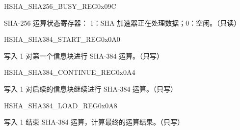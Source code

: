 \begin{register}{H}{SHA\_SHA256\_BUSY\_REG}{0x09C}\label{regdesc:SHASHA256BUSYREG}
%
%
\regnewline%
\begin{regdesc}\begin{reglist}
\item [SHA\_SHA256\_BUSY] SHA-256 运算状态寄存器： 1：SHA 加速器正在处理数据；0：空闲。（只读）
\end{reglist}\end{regdesc}
\end{register}


\begin{register}{H}{SHA\_SHA384\_START\_REG}{0x0A0}\label{regdesc:SHASHA384STARTREG}
%
%
\regnewline%
\begin{regdesc}\begin{reglist}
\item [SHA\_SHA384\_START] 写入 1 对第一个信息块进行 SHA-384 运算。（只写）
\end{reglist}\end{regdesc}
\end{register}


\begin{register}{H}{SHA\_SHA384\_CONTINUE\_REG}{0x0A4}\label{regdesc:SHASHA384CONTINUEREG}
%
%
\regnewline%
\begin{regdesc}\begin{reglist}
\item [SHA\_SHA384\_CONTINUE] 写入 1 对后续的信息块继续进行 SHA-384 运算。（只写）
\end{reglist}\end{regdesc}
\end{register}


\begin{register}{H}{SHA\_SHA384\_LOAD\_REG}{0x0A8}\label{regdesc:SHASHA384LOADREG}
%
%
\regnewline%
\begin{regdesc}\begin{reglist}
\item [SHA\_SHA384\_LOAD] 写入 1 结束 SHA-384 运算，计算最终的运算结果。（只写）
\end{reglist}\end{regdesc}
\end{register}


